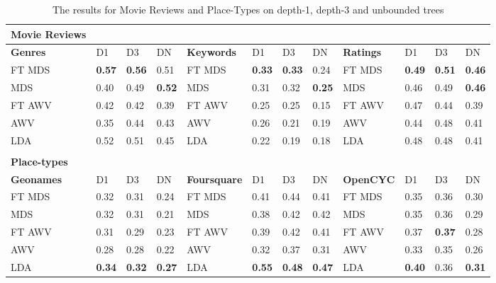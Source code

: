\begin{table}[t]
	\centering
	\small
	\setlength{\tabcolsep}{4.4pt}
	\renewcommand{\arraystretch}{1.1}
	\begin{tabularx}{\textwidth}{llllllllllll}
		\textbf{Movie Reviews} &      &      &      &            &      &      &      &                &      &      &      \\
		\toprule{}
		\textbf{Genres}        & D1   & D3   & DN   & \textbf{Keywords}   & D1   & D3   & DN   & \textbf{Ratings}        & D1   & D3   & DN   \\
		\midrule{}FT MDS        & \textbf{0.57} & \textbf{0.56} & 0.51 & FT MDS     & \textbf{0.33} & \textbf{0.33} & 0.24 & FT MDS         & \textbf{0.49} & \textbf{0.51} & \textbf{0.46} \\
		MDS           & 0.40 & 0.49 & \textbf{0.52} & MDS        & 0.31 & 0.32 & \textbf{0.25} & MDS            & 0.46 & 0.49 & \textbf{0.46} \\
		FT AWV        & 0.42 & 0.42 & 0.39 & FT AWV     & 0.25 & 0.25 & 0.15 & FT AWV         & 0.47 & 0.44 & 0.39 \\
		AWV           & 0.35 & 0.44 & 0.43 & AWV        & 0.26 & 0.21 & 0.19 & AWV            & 0.44 & 0.48 & 0.41 \\
		LDA           & 0.52 & 0.51 & 0.45 & LDA        & 0.22 & 0.19 & 0.18 & LDA            & 0.48 & 0.48 & 0.41 \\
		&      &      &      &            &      &      &      &                &      &      &      \\
	
		\textbf{Place-types}   &      &      &      &            &      &      &      &                &      &      &      \\
		\toprule{}
		\textbf{Geonames}      & D1   & D3   & DN   & \textbf{Foursquare} & D1   & D3   & DN   & \textbf{OpenCYC}        & D1   & D3   & DN   \\
		\midrule{}FT MDS        & 0.32 & 0.31 & 0.24 & FT MDS     & 0.41 & 0.44 & 0.41 & FT MDS         & 0.35 & 0.36 & 0.30 \\
		MDS           & 0.32 & 0.31 & 0.21 & MDS        & 0.38 & 0.42 & 0.42 & MDS            & 0.35 & 0.36 & 0.29 \\
		FT AWV        & 0.31 & 0.29 & 0.23 & FT AWV     & 0.39 & 0.42 & 0.41 & FT AWV         & 0.37 & \textbf{0.37} & 0.28 \\
		AWV           & 0.28 & 0.28 & 0.22 & AWV        & 0.32 & 0.37 & 0.31 & AWV            & 0.33 & 0.35 & 0.26 \\
		LDA           & \textbf{0.34} & \textbf{0.32} & \textbf{0.27} & LDA        & \textbf{0.55} & \textbf{0.48} & \textbf{0.47} & LDA            & \textbf{0.40} & 0.36 & \textbf{0.31} \\
		
	\end{tabularx}
	
	\caption{The results for Movie Reviews and Place-Types on depth-1, depth-3 and unbounded trees\label{tabResultsMoviePlaces}}
\end{table}
